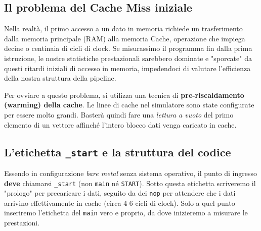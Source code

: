 \subsection{Il problema del Cache Miss iniziale}
Nella realtà, il primo accesso a un dato in memoria richiede un trasferimento dalla memoria principale (RAM) alla memoria Cache, operazione che impiega decine o centinaia di cicli di clock. Se misurassimo il programma fin dalla prima istruzione, le nostre statistiche prestazionali sarebbero dominate e "sporcate" da questi ritardi iniziali di accesso in memoria, impedendoci di valutare l'efficienza della nostra struttura della pipeline.

Per ovviare a questo problema, si utilizza una tecnica di \textbf{pre-riscaldamento (warming) della cache}. Le linee di cache nel simulatore sono state configurate per essere molto grandi. Basterà quindi fare una \textit{lettura a vuoto} del primo elemento di un vettore affinché l'intero blocco dati venga caricato in cache.

\subsection{L'etichetta \texttt{\_start} e la struttura del codice}
Essendo in configurazione \textit{bare metal} senza sistema operativo, il punto di ingresso \textbf{deve} chiamarsi \texttt{\_start} (non \texttt{main} né \texttt{START}). 
Sotto questa etichetta scriveremo il "prologo" per precaricare i dati, seguito da dei \texttt{nop} per attendere che i dati arrivino effettivamente in cache (circa 4-6 cicli di clock). Solo a quel punto inseriremo l'etichetta del \texttt{main} vero e proprio, da dove inizieremo a misurare le prestazioni.

